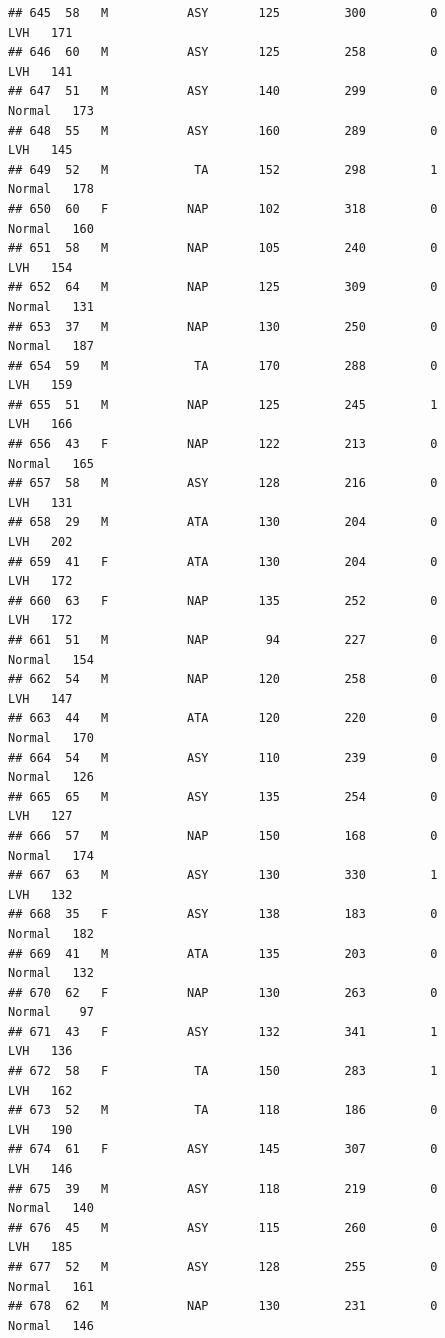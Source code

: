\documentclass[
]{article}
\begin{document}
\begin{verbatim}
## 645  58   M           ASY       125         300         0        LVH   171
## 646  60   M           ASY       125         258         0        LVH   141
## 647  51   M           ASY       140         299         0     Normal   173
## 648  55   M           ASY       160         289         0        LVH   145
## 649  52   M            TA       152         298         1     Normal   178
## 650  60   F           NAP       102         318         0     Normal   160
## 651  58   M           NAP       105         240         0        LVH   154
## 652  64   M           NAP       125         309         0     Normal   131
## 653  37   M           NAP       130         250         0     Normal   187
## 654  59   M            TA       170         288         0        LVH   159
## 655  51   M           NAP       125         245         1        LVH   166
## 656  43   F           NAP       122         213         0     Normal   165
## 657  58   M           ASY       128         216         0        LVH   131
## 658  29   M           ATA       130         204         0        LVH   202
## 659  41   F           ATA       130         204         0        LVH   172
## 660  63   F           NAP       135         252         0        LVH   172
## 661  51   M           NAP        94         227         0     Normal   154
## 662  54   M           NAP       120         258         0        LVH   147
## 663  44   M           ATA       120         220         0     Normal   170
## 664  54   M           ASY       110         239         0     Normal   126
## 665  65   M           ASY       135         254         0        LVH   127
## 666  57   M           NAP       150         168         0     Normal   174
## 667  63   M           ASY       130         330         1        LVH   132
## 668  35   F           ASY       138         183         0     Normal   182
## 669  41   M           ATA       135         203         0     Normal   132
## 670  62   F           NAP       130         263         0     Normal    97
## 671  43   F           ASY       132         341         1        LVH   136
## 672  58   F            TA       150         283         1        LVH   162
## 673  52   M            TA       118         186         0        LVH   190
## 674  61   F           ASY       145         307         0        LVH   146
## 675  39   M           ASY       118         219         0     Normal   140
## 676  45   M           ASY       115         260         0        LVH   185
## 677  52   M           ASY       128         255         0     Normal   161
## 678  62   M           NAP       130         231         0     Normal   146

\end{verbatim}
\end{document}
